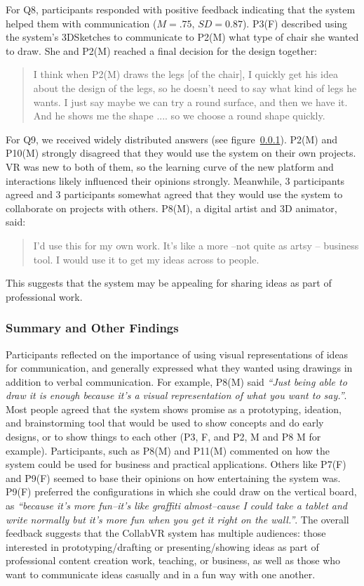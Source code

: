 \documentclass[chi_draft]{sigchi}
\begin{document}
For Q8, participants responded with positive feedback indicating that the system helped them with communication ($M=.75$, $SD=0.87$).
P3(F) described using the system's 3DSketches to communicate to P2(M) what type of chair she wanted to draw. She and P2(M) reached a final decision for the design together:
\begin{quote}
    I think when P2(M) draws the legs [of the chair], I quickly get his idea about the design of the legs, so he doesn't need to say what kind of legs he wants. I just say maybe we can try a round surface, and then we have it. And he shows me the shape .... so we choose a round shape quickly.
\end{quote}


For Q9, we received widely distributed answers (see figure~\ref{}). P2(M) and P10(M) strongly disagreed that they would use the system on their own projects. VR was new to both of them, so the learning curve of the new platform and interactions likely influenced their opinions strongly. Meanwhile, 3 participants agreed and 3 participants somewhat agreed that they would use the system to collaborate on projects with others. P8(M), a digital artist and 3D animator, said:
\begin{quote}
    I'd use this for my own work. It's like a more --not quite as artsy -- business tool. I would use it to get my ideas across to people.
\end{quote}
This suggests that the system may be appealing for sharing ideas as part of professional work.
\subsubsection{Summary and Other Findings}

Participants reflected on the importance of using visual representations of ideas for communication, and generally expressed what they wanted using drawings in addition to verbal communication. For example, P8(M) said \textit{``Just being able to draw it is enough because it's a visual representation of what you want to say.''}. Most people agreed that the system shows promise as a prototyping, ideation, and brainstorming tool that would be used to show concepts and do early designs, or to show things to each other (P3, F, and P2, M and P8 M for example). Participants, such as P8(M) and P11(M) commented on how the system could be used for business and practical applications. Others like P7(F) and P9(F) seemed to base their opinions on how entertaining the system was. P9(F) preferred the configurations in which she could draw on the vertical board, as \textit{``because it's more fun--it's like graffiti almost--cause I could take a tablet and write normally but it's more fun when you get it right on the wall.''}. The overall feedback suggests that the CollabVR system has multiple audiences: those interested in prototyping/drafting or presenting/showing ideas as part of professional content creation work, teaching, or business, as well as those who want to communicate ideas casually and in a fun way with one another.
\end{document}
